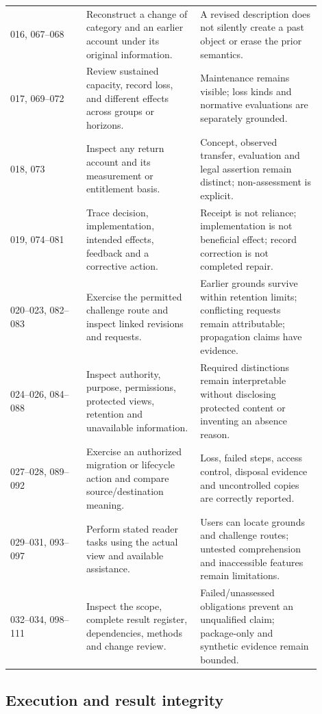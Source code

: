 \documentclass[11pt,a4paper]{article}
\begin{document}
\begin{longtable}{@{}L{0.22\linewidth}L{0.33\linewidth}L{0.35\linewidth}@{}}
016, 067--068 & Reconstruct a change of category and an earlier account under its original information. & A revised description does not silently create a past object or erase the prior semantics.\\
017, 069--072 & Review sustained capacity, record loss, and different effects across groups or horizons. & Maintenance remains visible; loss kinds and normative evaluations are separately grounded.\\
018, 073 & Inspect any return account and its measurement or entitlement basis. & Concept, observed transfer, evaluation and legal assertion remain distinct; non-assessment is explicit.\\
019, 074--081 & Trace decision, implementation, intended effects, feedback and a corrective action. & Receipt is not reliance; implementation is not beneficial effect; record correction is not completed repair.\\
020--023, 082--083 & Exercise the permitted challenge route and inspect linked revisions and requests. & Earlier grounds survive within retention limits; conflicting requests remain attributable; propagation claims have evidence.\\
024--026, 084--088 & Inspect authority, purpose, permissions, protected views, retention and unavailable information. & Required distinctions remain interpretable without disclosing protected content or inventing an absence reason.\\
027--028, 089--092 & Exercise an authorized migration or lifecycle action and compare source/destination meaning. & Loss, failed steps, access control, disposal evidence and uncontrolled copies are correctly reported.\\
029--031, 093--097 & Perform stated reader tasks using the actual view and available assistance. & Users can locate grounds and challenge routes; untested comprehension and inaccessible features remain limitations.\\
032--034, 098--111 & Inspect the scope, complete result register, dependencies, methods and change review. & Failed/unassessed obligations prevent an unqualified claim; package-only and synthetic evidence remain bounded.\\
\bottomrule
\end{longtable}

\subsection{Execution and result integrity}
\end{document}
